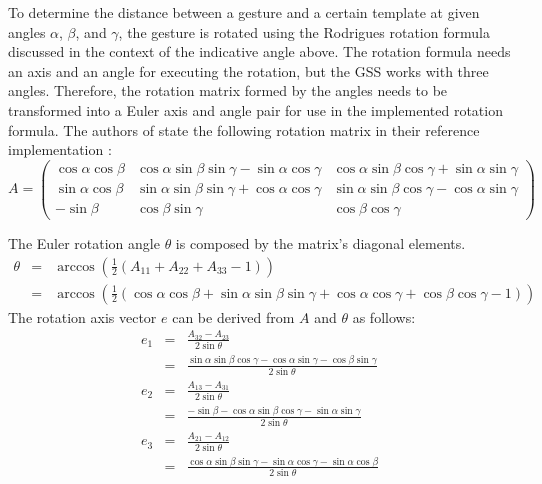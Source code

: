 To determine the distance between a gesture and a certain template at given angles $\alpha$, $\beta$, and $\gamma$, the gesture is rotated using the Rodrigues rotation formula discussed in the context of the indicative angle above. The rotation formula needs an axis and an angle for executing the rotation, but the \ac{GSS} works with three angles. Therefore, the rotation matrix formed by the angles needs to be transformed into a Euler axis and angle pair for use in the implemented rotation formula. The authors of \cite{Kratz2010} state the following rotation matrix in their reference implementation \cite{repo:3dollar}:
\[
A = 
\begin{pmatrix}
\cos{\alpha}\cos{\beta} & \cos{\alpha}\sin{\beta}\sin{\gamma} - \sin{\alpha}\cos{\gamma} & \cos{\alpha}\sin{\beta}\cos{\gamma} + \sin{\alpha}\sin{\gamma} \\
\sin{\alpha}\cos{\beta} & \sin{\alpha}\sin{\beta}\sin{\gamma} + \cos{\alpha}\cos{\gamma} & \sin{\alpha}\sin{\beta}\cos{\gamma} - \cos{\alpha}\sin{\gamma} \\
-\sin{\beta} & \cos{\beta}\sin{\gamma} & \cos{\beta}\cos{\gamma}
\end{pmatrix}
\]

The Euler rotation angle $ \theta $ is composed by the matrix's diagonal elements.
\begin{eqnarray*}
\theta & = & \arccos\left(\frac{1}{2}\left(A_{11} + A_{22} + A_{33} - 1\right)\right) \\
       & = & \arccos\left(\frac{1}{2}\left(\cos\alpha\cos\beta+\sin\alpha\sin\beta\sin\gamma+\cos\alpha\cos\gamma+\cos\beta\cos\gamma-1\right)\right)
\end{eqnarray*}
The rotation axis vector $ e $ can be derived from $ A $ and $ \theta $ as follows:
\begin{eqnarray*}
e_1 & = &  \frac{A_{32} - A_{23}}{2\sin\theta} \\
    & = & \frac{\sin\alpha\sin\beta\cos\gamma-\cos\alpha\sin\gamma-\cos\beta\sin\gamma}{2\sin\theta} \\
e_2 & = & \frac{A_{13} - A_{31}}{2\sin\theta} \\
    & = & \frac{-\sin\beta-\cos\alpha\sin\beta\cos\gamma-\sin\alpha\sin\gamma}{2\sin\theta} \\
e_3 & = & \frac{A_{21} - A_{12}}{2\sin\theta} \\
    & = & \frac{\cos\alpha\sin\beta\sin\gamma-\sin\alpha\cos\gamma-\sin\alpha\cos\beta}{2\sin\theta}
\end{eqnarray*}

